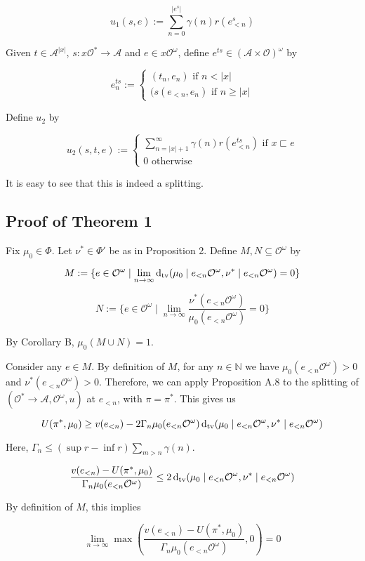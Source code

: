 \documentclass[a4paper]{article}
\newcommand{\Dtv}{\operatorname{d}_{\textnormal{tv}}}
\newcommand{\Nats}{\mathbb{N}}
\newcommand{\Abs}[1]{\lvert #1 \rvert}
\newcommand{\Act}{\mathcal{A}}
\newcommand{\Obs}{\mathcal{O}}
\newcommand{\ObsO}{\Obs^\omega}
\newcommand{\Pol}{\Obs^* \rightarrow \Act}
\begin{document}
$$u_1(s,e):=\sum_{n = 0}^{\Abs{e^s}} \gamma(n) r(e^s_{<n})$$

Given ${t \in \Act^{\Abs{x}}}$, ${s: x\Obs^* \rightarrow \Act}$ and ${e \in x\ObsO}$, define ${e^{ts} \in (\Act \times \Obs)^\omega}$ by

$$e^{ts}_n:=\begin{cases}(t_n,e_n) \text{ if } n < \Abs{x}\\(s(e_{<n},e_n) \text{ if } n \geq \Abs{x}\end{cases}$$

Define ${u_2}$ by

$$u_2(s,t,e):=\begin{cases}\sum_{n = \Abs{x}+1}^{\infty} \gamma(n) r(e^{ts}_{<n}) \text{ if } x \sqsubset e\\0 \text{ otherwise}\end{cases}$$

It is easy to see that this is indeed a splitting.

\subsection{Proof of Theorem 1}

Fix ${\mu_0 \in \Phi}$. Let ${\nu^* \in \Phi'}$ be as in Proposition 2. Define ${M,N \subseteq \ObsO}$ by

$$M:=\{e \in \ObsO \mid \lim_{n \rightarrow \infty} \Dtv(\mu_0 \mid e_{<n}\ObsO, \nu^* \mid e_{<n}\ObsO) = 0\}$$

$$N:=\{e \in \ObsO \mid \lim_{n \rightarrow \infty} \frac{\nu^*(e_{<n}\ObsO)}{\mu_0(e_{<n}\ObsO)} = 0\}$$

By Corollary B, ${\mu_0(M \cup N) = 1}$.

Consider any ${e \in M}$. By definition of ${M}$, for any ${n \in \Nats}$ we have ${\mu_0(e_{<n}\ObsO) > 0}$ and ${\nu^*(e_{<n}\ObsO) > 0}$. Therefore, we can apply Proposition A.8 to the splitting of ${(\Pol,\ObsO,u)}$ at ${e_{<n}}$, with ${\pi = \pi^*}$. This gives us

$$U(\pi^*,\mu_0) \geq v(e_{<n})-2\Gamma_n \mu_0(e_{<n}\ObsO)\Dtv(\mu_0 \mid e_{<n}\ObsO, \nu^* \mid e_{<n}\ObsO)$$

Here, ${\Gamma_n \leq (\sup r - \inf r) \sum_{m > n} \gamma(n)}$. 

$$\frac{v(e_{<n}) - U(\pi^*,\mu_0)}{\Gamma_n \mu_0(e_{<n}\ObsO)} \leq 2\Dtv(\mu_0 \mid e_{<n}\ObsO, \nu^* \mid e_{<n}\ObsO)$$

By definition of ${M}$, this implies

$$\lim_{n \rightarrow \infty} \max(\frac{v(e_{<n}) - U(\pi^*,\mu_0)}{\Gamma_n \mu_0(e_{<n}\ObsO)},0) = 0 $$
\end{document}
